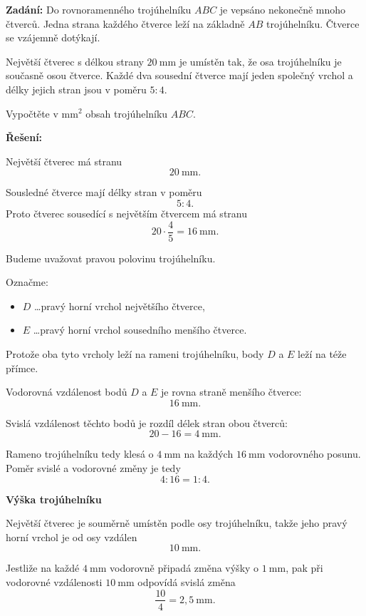 \documentclass[12pt,a4paper]{article}
\begin{document}
\textbf{Zadání:}  
Do rovnoramenného trojúhelníku \(ABC\) je vepsáno nekonečně mnoho čtverců. Jedna strana každého čtverce leží na základně \(AB\) trojúhelníku. Čtverce se vzájemně dotýkají.

Největší čtverec s délkou strany \(20\ \mathrm{mm}\) je umístěn tak, že osa trojúhelníku je současně osou čtverce. Každé dva sousední čtverce mají jeden společný vrchol a délky jejich stran jsou v poměru \(5:4\).

Vypočtěte v \(\mathrm{mm}^2\) obsah trojúhelníku \(ABC\).

\bigskip

\textbf{Řešení:}

Největší čtverec má stranu
\[
20\ \mathrm{mm}.
\]

Sousledné čtverce mají délky stran v poměru
\[
5:4.
\]
Proto čtverec sousedící s největším čtvercem má stranu
\[
20\cdot \frac{4}{5}=16\ \mathrm{mm}.
\]

\medskip

Budeme uvažovat pravou polovinu trojúhelníku.

Označme:
\begin{itemize}
    \item \(D\) \dots pravý horní vrchol největšího čtverce,
    \item \(E\) \dots pravý horní vrchol sousedního menšího čtverce.
\end{itemize}

Protože oba tyto vrcholy leží na rameni trojúhelníku, body \(D\) a \(E\) leží na téže přímce.

\medskip

Vodorovná vzdálenost bodů \(D\) a \(E\) je rovna straně menšího čtverce:
\[
16\ \mathrm{mm}.
\]

Svislá vzdálenost těchto bodů je rozdíl délek stran obou čtverců:
\[
20-16=4\ \mathrm{mm}.
\]

Rameno trojúhelníku tedy klesá o \(4\ \mathrm{mm}\) na každých \(16\ \mathrm{mm}\) vodorovného posunu. Poměr svislé a vodorovné změny je tedy
\[
4:16=1:4.
\]

\bigskip

\textbf{Výška trojúhelníku}

Největší čtverec je souměrně umístěn podle osy trojúhelníku, takže jeho pravý horní vrchol je od osy vzdálen
\[
10\ \mathrm{mm}.
\]

Jestliže na každé \(4\ \mathrm{mm}\) vodorovně připadá změna výšky o \(1\ \mathrm{mm}\), pak při vodorovné vzdálenosti \(10\ \mathrm{mm}\) odpovídá svislá změna
\[
\frac{10}{4}=2{,}5\ \mathrm{mm}.
\]
\end{document}
